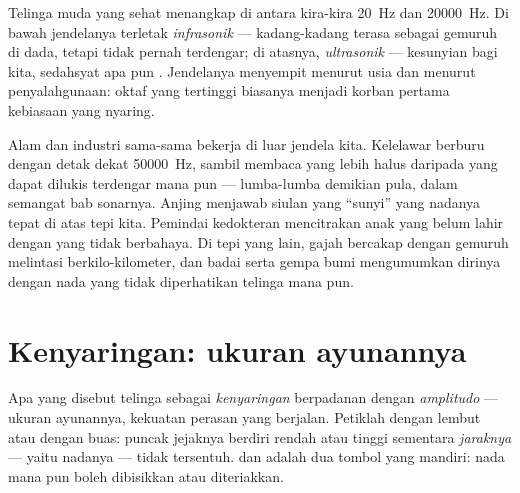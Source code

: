 \begin{proposition}\label{prop:g8:sound-pitch-loudness:range}
Telinga muda yang sehat menangkap  di antara kira-kira
\qty{20}{Hz} dan \qty{20000}{Hz}. Di bawah jendelanya terletak
\emph{infrasonik} --- kadang-kadang terasa sebagai
gemuruh di dada, tetapi tidak pernah terdengar; di atasnya,
\emph{ultrasonik} --- kesunyian bagi kita, sedahsyat
apa pun . Jendelanya menyempit menurut usia dan menurut
penyalahgunaan: oktaf yang tertinggi biasanya menjadi korban pertama
kebiasaan yang nyaring.
\end{proposition}

\begin{example}\label{ex:g8:sound-pitch-loudness:beyond}
Alam dan industri sama-sama bekerja di luar jendela kita. Kelelawar
berburu dengan detak  dekat \qty{50000}{Hz}, sambil membaca
 yang lebih halus daripada yang dapat dilukis  terdengar mana
pun --- lumba-lumba demikian pula, dalam semangat bab sonarnya. Anjing
menjawab siulan yang ``sunyi'' yang nadanya tepat di atas tepi kita.
Pemindai kedokteran mencitrakan anak yang belum lahir dengan 
 yang tidak berbahaya. Di tepi yang lain, gajah bercakap
dengan gemuruh  melintasi berkilo-kilometer, dan badai serta
gempa bumi mengumumkan dirinya dengan nada yang tidak diperhatikan
telinga mana pun.
\end{example}

\section{Kenyaringan: ukuran ayunannya}

\begin{proposition}\label{prop:g8:sound-pitch-loudness:loudness}
Apa yang disebut telinga sebagai \emph{kenyaringan} berpadanan dengan
\emph{amplitudo}  --- ukuran ayunannya,
kekuatan perasan yang berjalan. Petiklah dengan lembut atau dengan
buas: puncak jejaknya berdiri rendah atau tinggi sementara
\emph{jaraknya} --- yaitu nadanya --- tidak tersentuh.  dan
 adalah dua tombol yang mandiri: nada mana pun boleh
dibisikkan atau diteriakkan.
\end{proposition}

